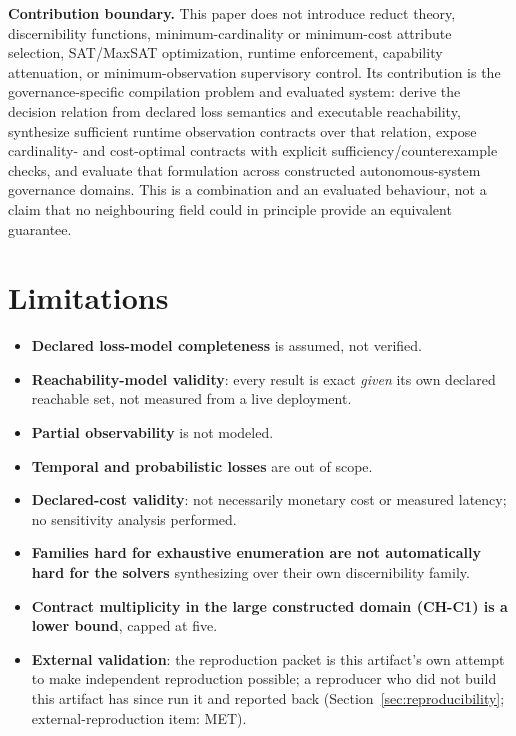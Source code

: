 \documentclass[11pt,a4paper]{article}
\theoremstyle{definition}
\begin{document}
\noindent\textbf{Contribution boundary.} This paper does not introduce reduct theory, discernibility functions, minimum-cardinality or minimum-cost attribute selection, SAT/MaxSAT optimization, runtime enforcement, capability attenuation, or minimum-observation supervisory control. Its contribution is the governance-specific compilation problem and evaluated system: derive the decision relation from declared loss semantics and executable reachability, synthesize sufficient runtime observation contracts over that relation, expose cardinality- and cost-optimal contracts with explicit sufficiency/counterexample checks, and evaluate that formulation across constructed autonomous-system governance domains. This is a combination and an evaluated behaviour, not a claim that no neighbouring field could in principle provide an equivalent guarantee.

\section{Limitations}
\label{sec:limitations}

\begin{itemize}
\item \textbf{Declared loss-model completeness} is assumed, not verified.
\item \textbf{Reachability-model validity}: every result is exact \emph{given} its own declared reachable set, not measured from a live deployment.
\item \textbf{Partial observability} is not modeled.
\item \textbf{Temporal and probabilistic losses} are out of scope.
\item \textbf{Declared-cost validity}: not necessarily monetary cost or measured latency; no sensitivity analysis performed.
\item \textbf{Families hard for exhaustive enumeration are not automatically hard for the solvers} synthesizing over their own discernibility family.
\item \textbf{Contract multiplicity in the large constructed domain (CH-C1) is a lower bound}, capped at five.
\item \textbf{External validation}: the reproduction packet is this artifact's own attempt to make independent reproduction possible; a reproducer who did not build this artifact has since run it and reported back (Section~\ref{sec:reproducibility}; external-reproduction item: MET).
\end{itemize}
\end{document}
